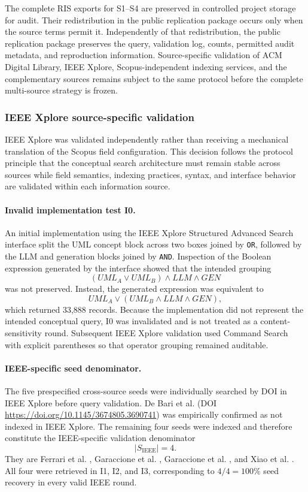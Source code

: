 The complete RIS exports for S1--S4 are preserved in controlled project storage
for audit. Their redistribution in the public replication package occurs only
when the source terms permit it. Independently of that redistribution, the
public replication package preserves the query, validation log, counts,
permitted audit metadata, and reproduction information. Source-specific
validation of ACM Digital Library, IEEE Xplore,
Scopus-independent indexing services, and the complementary sources remains
subject to the same protocol before the complete multi-source strategy is frozen.


\subsubsection{IEEE Xplore source-specific validation}
\label{sec:ieee_validation}

IEEE Xplore was validated independently rather than receiving a mechanical
translation of the Scopus field configuration. This decision follows the
protocol principle that the conceptual search architecture must remain stable
across sources while field semantics, indexing practices, syntax, and interface
behavior are validated within each information source.

\paragraph{Invalid implementation test I0.}
An initial implementation using the IEEE Xplore Structured Advanced Search
interface split the UML concept block across two boxes joined by \texttt{OR},
followed by the LLM and generation blocks joined by \texttt{AND}. Inspection
of the Boolean expression generated by the interface showed that the intended
grouping
\[
(UML_A \lor UML_B) \land LLM \land GEN
\]
was not preserved. Instead, the generated expression was equivalent to
\[
UML_A \lor (UML_B \land LLM \land GEN),
\]
which returned 33,888 records. Because the implementation did not represent the
intended conceptual query, I0 was invalidated and is not treated as a
content-sensitivity round. Subsequent IEEE Xplore validation used Command Search
with explicit parentheses so that operator grouping remained auditable.

\paragraph{IEEE-specific seed denominator.}
The five prespecified cross-source seeds were individually searched by DOI in
IEEE Xplore before query validation. De Bari et al. \cite{DeBari2024UML}
(DOI \url{https://doi.org/10.1145/3674805.3690741}) was empirically confirmed
as not indexed in IEEE Xplore. The remaining four seeds were indexed and
therefore constitute the IEEE-specific validation denominator
\[
|S_{\mathrm{IEEE}}|=4.
\]
They are Ferrari et al. \cite{Ferrari2024Sequence}, Garaccione et al.
\cite{Garaccione2025Class}, Garaccione et al. \cite{Garaccione2025UseCase},
and Xiao et al. \cite{Xiao2025Sequence}. All four were retrieved in I1, I2,
and I3, corresponding to \(4/4=100\%\) seed recovery in every valid IEEE round.

